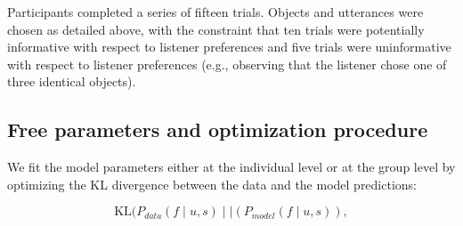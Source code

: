 \documentclass[11pt,a4paper]{article}
\newcommand{\gcs}[1]{\textcolor{blue}{[gcs: #1]}}
\begin{document}

Participants completed a series of fifteen trials. Objects and utterances were chosen as detailed above, with the constraint that ten trials were potentially informative with respect to listener preferences and five trials were uninformative with respect to listener preferences (e.g., observing that the listener chose one of three identical objects). 

\subsection{Free parameters and optimization procedure}



We fit the model parameters either at the individual level or at the group level by optimizing the KL divergence between the data and the model predictions:

\begin{equation}
	\textrm{KL}(P_{data}(f \mid u,s)\mid\mid (P_{model}(f\mid u,s)),
\end{equation}
\end{document}
